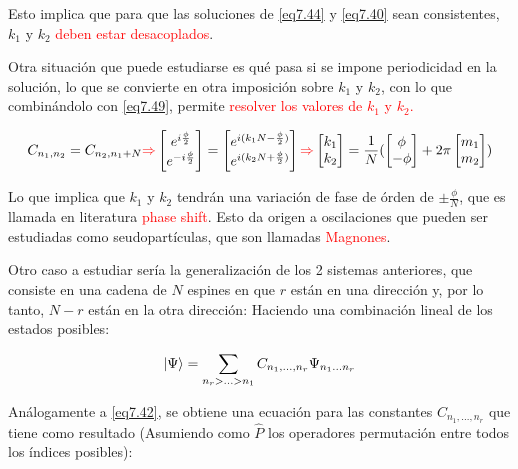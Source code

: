 \documentclass{book}
\begin{document}
Esto implica que para que las soluciones de \ref{eq7.44} y \ref{eq7.40} sean consistentes, $k_1$ y $k_2$ \textcolor{red}{deben estar desacoplados}.

Otra situación que puede estudiarse es qué pasa si se impone periodicidad en la solución, lo    que se convierte en otra imposición sobre $k_1$ y $k_2$, con lo que combinándolo con \ref{eq7.49}, permite \textcolor{red}{resolver los valores de $k_1$ y $k_2$.}

\begin{equation}\label{eq7.50} C_{n_1,n_2}=C_{n_2,n_1+N} \textcolor{red}{\Rightarrow} \begin{bmatrix} e^{i\frac{\phi}{2}} \\ e^{-i\frac{\phi}{2}} \end{bmatrix} = \begin{bmatrix} e^{i(k_1 N-\frac{\phi}{2})} \\ e^{i(k_2N+\frac{\phi}{2})} \end{bmatrix}\textcolor{red}{\Rightarrow} \begin{bmatrix} k_1 \\ k_2 \end{bmatrix} = \frac{1}{N}(\begin{bmatrix} \phi \\ -\phi \end{bmatrix}+2\pi \begin{bmatrix} m_1 \\ m_2 \end{bmatrix}) \end{equation}

Lo que implica que $k_1$ y $k_2$ tendrán una variación de fase de órden de $\pm\frac{\phi}{N}$, que es llamada en literatura \textcolor{red}{phase shift}. Esto da origen a oscilaciones que pueden ser estudiadas como seudopartículas, que son llamadas \textcolor{red}{Magnones}.

Otro caso a estudiar sería la generalización de los 2 sistemas anteriores, que consiste en una cadena de $N$ espines en que $r$ están en una dirección y, por lo tanto, $N-r$ están en la otra dirección:
Haciendo una combinación lineal de los estados posibles:

\begin{equation}\label{eq7.51}\ket{\Psi}=\sum_{n_r>...>n_1} C_{n_1,...,n_r}\Psi_{n_1...n_r}\end{equation}

Análogamente a \ref{eq7.42}, se obtiene una ecuación para las constantes $C_{n_1,...,n_r}$ que tiene como resultado (Asumiendo como $\hat{P}$ los operadores permutación entre todos los índices posibles):
\end{document}

